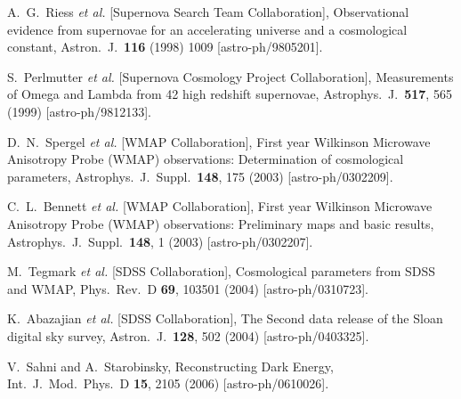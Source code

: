 \documentclass[aps,prd,nofootinbib,amsmath,amssymb,superscriptaddress,twocolumn,10pt]{revtex4}%
\begin{document}
\begin{thebibliography}{99}

  A.~G.~Riess {\it et al.} [Supernova Search Team Collaboration],
  Observational evidence from supernovae for an accelerating universe and a cosmological constant,
  Astron.\ J.\  {\bf 116} (1998) 1009
  [astro-ph/9805201].

  S.~Perlmutter {\it et al.} [Supernova Cosmology Project Collaboration],
  Measurements of Omega and Lambda from 42 high redshift supernovae,
  Astrophys.\ J.\  {\bf 517}, 565 (1999)
  [astro-ph/9812133].



  D.~N.~Spergel {\it et al.} [WMAP Collaboration],
  First year Wilkinson Microwave Anisotropy Probe (WMAP) observations: Determination of cosmological parameters,
  Astrophys.\ J.\ Suppl.\  {\bf 148}, 175 (2003)
  [astro-ph/0302209].

  C.~L.~Bennett {\it et al.} [WMAP Collaboration],
  First year Wilkinson Microwave Anisotropy Probe (WMAP) observations: Preliminary maps and basic results,
  Astrophys.\ J.\ Suppl.\  {\bf 148}, 1 (2003)
  [astro-ph/0302207].

  M.~Tegmark {\it et al.} [SDSS Collaboration],
  Cosmological parameters from SDSS and WMAP,
  Phys.\ Rev.\ D {\bf 69}, 103501 (2004)
  [astro-ph/0310723].

  K.~Abazajian {\it et al.} [SDSS Collaboration],
  The Second data release of the Sloan digital sky survey,
  Astron.\ J.\  {\bf 128}, 502 (2004)
  [astro-ph/0403325].




  V.~Sahni and A.~Starobinsky,
  Reconstructing Dark Energy,
  Int.\ J.\ Mod.\ Phys.\ D {\bf 15}, 2105 (2006)
  [astro-ph/0610026].


\end{thebibliography}
\end{document}
